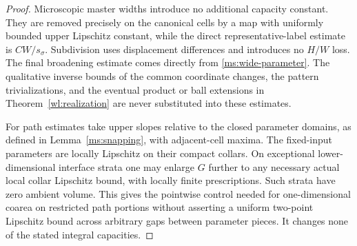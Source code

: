 \begin{proof}
Microscopic master widths introduce no additional capacity
constant.  They are removed precisely on the canonical cells
by a map with uniformly bounded upper Lipschitz constant, while
the direct representative-label estimate is $CW/s_\sigma$.
Subdivision uses displacement differences and introduces no
$H/W$ loss.  The final broadening estimate comes directly
from \eqref{ms:wide-parameter}.  The qualitative inverse bounds
of the common coordinate changes, the pattern trivializations,
and the eventual product or ball extensions in
Theorem~\ref{wl:realization} are never substituted into these estimates.

For path estimates take upper slopes relative to the closed
parameter domains, as defined in Lemma~\ref{ms:snapping}, with
adjacent-cell maxima.  The fixed-input parameters are locally
Lipschitz on their compact collars.  On exceptional
lower-dimensional interface strata one may enlarge $G$ further
to any necessary actual local collar Lipschitz bound, with
locally finite prescriptions.  Such strata have zero ambient
volume.  This gives the pointwise control needed for
one-dimensional coarea on restricted path portions without
asserting a uniform two-point Lipschitz bound across arbitrary
gaps between parameter pieces.  It changes none of the stated
integral capacities.
\end{proof}
